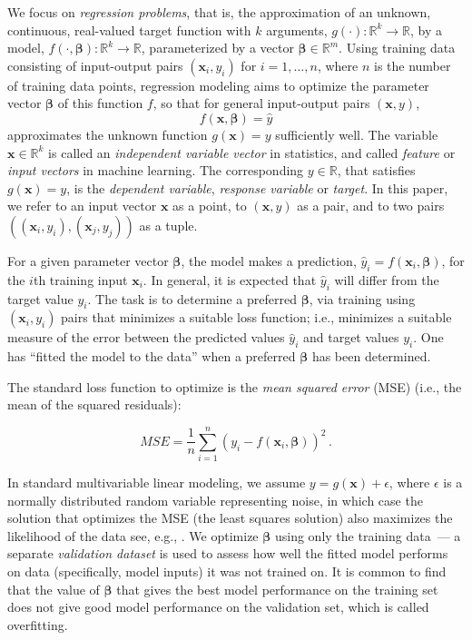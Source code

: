 \documentclass[conference]{IEEEtran}
\begin{document}
We focus on \emph{regression problems}, that is, the approximation of an unknown, continuous, real-valued target function with $k$ arguments, $g(\cdot):{\mathbb R}^{k}\to{\mathbb R}$, by a model, $f(\cdot,\boldsymbol{\beta}):{\mathbb R}^{k}\to{\mathbb R}$, parameterized by a vector $\boldsymbol{\beta}\in{\mathbb R}^m$. 
Using training data consisting of input-output pairs $(\mathbf{x}_i,y_i)$ for $i=1,\ldots,n$, where $n$ is the number of training data points, regression modeling aims to optimize the parameter vector $\boldsymbol{\beta}$ of this function $f$, so that for general input-output pairs $(\mathbf{x},y)$, 
\begin{equation}
 f(\mathbf{x},\boldsymbol{\beta}) = \hat{y}
\end{equation}
approximates the unknown function $g(\mathbf{x})=y$ sufficiently well. 
The variable $\mathbf{x}\in\mathbb{R}^k$ is called an 
\textit{independent variable vector} in statistics, and called \textit{feature} or \textit{input vectors} in machine learning. The corresponding $y \in \mathbb{R}$, that satisfies $g(\mathbf{x})=y$, is the \textit{dependent variable}, \textit{response variable} or \textit{target}.
In this paper, we refer to an input vector $\mathbf{x}$ as a point, to $(\mathbf{x},y)$ as a pair, and to two pairs $((\mathbf{x}_i,y_i),(\mathbf{x}_j,y_j))$ as a tuple.


For a given parameter vector $\boldsymbol{\beta}$, the model makes a prediction, $\hat{y}_i = f(\mathbf{x}_i,\boldsymbol{\beta})$, for the $i$th training input $\mathbf{x}_i$.
In general, it is expected that $\hat{y}_i$ will differ from the target value $y_i$. The task is to determine a preferred $\boldsymbol{\beta}$, via training using $(\mathbf{x}_i,y_i)$ pairs that minimizes a suitable loss function; i.e., minimizes a suitable measure of the error between the predicted values $\hat{y}_i$ and target values $y_i$. 
One has ``fitted the model to the data'' when a preferred $\boldsymbol \beta$ has been determined.

The standard loss function to optimize is the \emph{mean squared error} (MSE) (i.e., the mean of the squared residuals):

\begin{equation}
 MSE = \frac{1}{n}\sum_{i=1}^n (y_i - f(\mathbf{x}_i,\boldsymbol{\beta}))^2\,.
\end{equation}

In standard multivariable linear modeling, we assume $y = g(\mathbf{x}) + \epsilon $, where $\epsilon$ is a normally distributed random variable representing noise, in which case the solution that optimizes the MSE (the least squares solution) also maximizes the likelihood of the data see, e.g., \cite{hastie01statisticallearning}.
We optimize $\boldsymbol{\beta}$ using only the training data~--- a separate \emph{validation dataset} is used to assess how well the fitted model performs on data (specifically, model inputs) it was not trained on. 
It is common to find that the value of $\boldsymbol{\beta}$ that gives the best model performance on the training set does not give good model performance on the validation set, which is called overfitting. 
\end{document}

